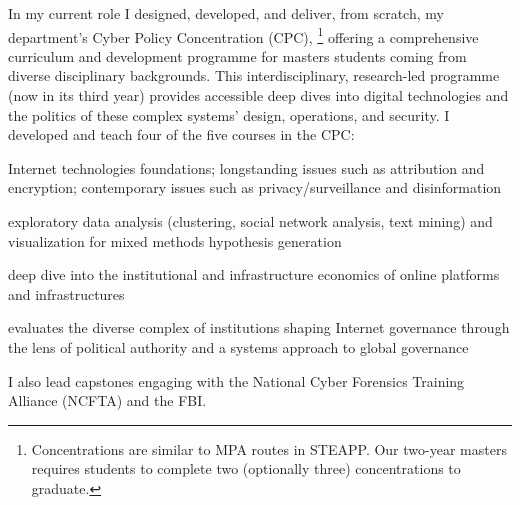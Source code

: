 \documentclass[11pt]{letter}
\begin{document}
\begin{letter}
In my current role I designed, developed, and deliver, from scratch, my department's Cyber Policy Concentration (CPC),%
  \footnote{Concentrations are similar to MPA routes in STEAPP.  Our two-year masters requires students to complete two (optionally three) concentrations to graduate.} %
offering a comprehensive curriculum and development programme for masters students coming from diverse disciplinary backgrounds.
%
This interdisciplinary, research-led programme (now in its third year) provides accessible deep dives into digital technologies and the politics of these complex systems' design, operations, and security.
%
I developed and teach four of the five courses in the CPC:
%
\begin{description}[leftmargin=0.5cm]
  \item[Introduction to Cyber Policy:] Internet technologies foundations; longstanding issues such as attribution and encryption; contemporary issues such as privacy/surveillance and disinformation

  \item[Data Science and Visualization for Policy Analysis:] exploratory data analysis (clustering, social network analysis, text mining) and visualization for mixed methods hypothesis generation

  \item[Internet Infrastructure: Platforms and Politics:] deep dive into the institutional and infrastructure economics of online platforms and infrastructures

  \item[Advanced Cyber Policy:] evaluates the diverse complex of institutions shaping Internet governance through the lens of political authority and a systems approach to global governance
\end{description}
%
I also lead capstones engaging with the National Cyber Forensics Training Alliance (NCFTA) and the FBI.


\end{letter}
\end{document}
